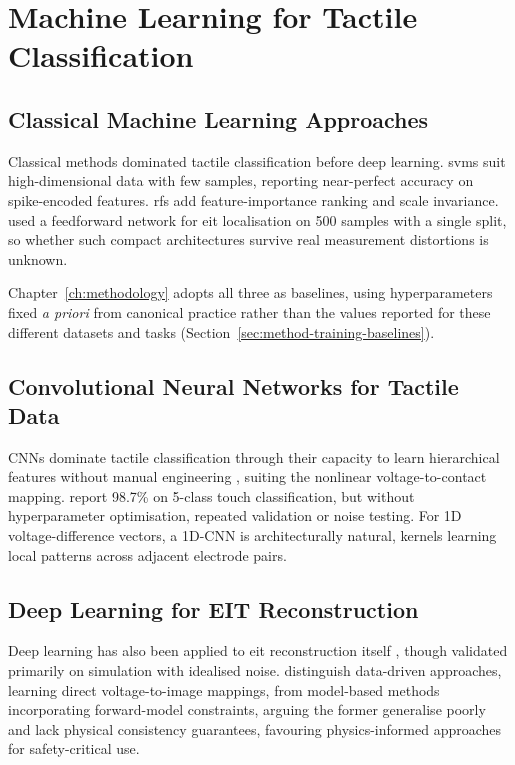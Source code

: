 \section{Machine Learning for Tactile Classification}
\label{sec:lit-ml}

\subsection{Classical Machine Learning Approaches}
\label{sec:lit-ml-classical}


Classical methods dominated tactile classification before deep learning. \glspl{svm} \parencite{cortes1995} suit high-dimensional data with few samples, \textcite{rahiminejad2021} reporting near-perfect accuracy on spike-encoded features. \glspl{rf} \parencite{breiman2001} add feature-importance ranking and scale invariance. \textcite{costacornella2023} used a feedforward network for \gls{eit} localisation on 500 samples with a single split, so whether such compact architectures survive real measurement distortions is unknown.


Chapter~\ref{ch:methodology} adopts all three as baselines, using hyperparameters fixed \emph{a priori} from canonical practice rather than the values reported for these different datasets and tasks (Section~\ref{sec:method-training-baselines}).

\subsection{Convolutional Neural Networks for Tactile Data}
\label{sec:lit-ml-cnn}

CNNs dominate tactile classification through their capacity to learn hierarchical features without manual engineering \parencite{lecun2015}, suiting the nonlinear voltage-to-contact mapping. \textcite{park2022skin} report 98.7\% on 5-class touch classification, but without hyperparameter optimisation, repeated validation or noise testing. For 1D voltage-difference vectors, a 1D-CNN is architecturally natural, kernels learning local patterns across adjacent electrode pairs.


\subsection{Deep Learning for EIT Reconstruction}
\label{sec:lit-ml-dl-eit}

Deep learning has also been applied to \gls{eit} reconstruction itself \parencite{hamilton2018, wei2020}, though validated primarily on simulation with idealised noise. \textcite{cebrian2025} distinguish data-driven approaches, learning direct voltage-to-image mappings, from model-based methods incorporating forward-model constraints, arguing the former generalise poorly and lack physical consistency guarantees, favouring physics-informed approaches for safety-critical use.

